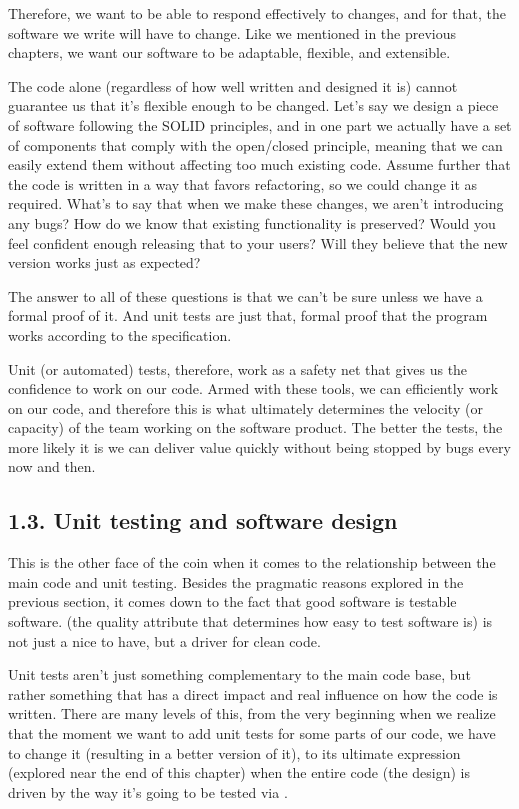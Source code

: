 \documentclass[a4paper,10pt,english]{sphinxmanual}
\begin{document}
Therefore, we want to be able to respond effectively to changes, and for that, the software
we write will have to change. Like we mentioned in the previous chapters, we want our
software to be adaptable, flexible, and extensible.

The code alone (regardless of how well written and designed it is) cannot guarantee us that
it’s flexible enough to be changed. Let’s say we design a piece of software following the
SOLID principles, and in one part we actually have a set of components that comply with
the open/closed principle, meaning that we can easily extend them without affecting too
much existing code. Assume further that the code is written in a way that favors
refactoring, so we could change it as required. What’s to say that when we make these
changes, we aren’t introducing any bugs? How do we know that existing functionality is
preserved? Would you feel confident enough releasing that to your users? Will they believe
that the new version works just as expected?

The answer to all of these questions is that we can’t be sure unless we have a formal proof
of it. And unit tests are just that, formal proof that the program works according to the
specification.

Unit (or automated) tests, therefore, work as a safety net that gives us the confidence to
work on our code. Armed with these tools, we can efficiently work on our code, and
therefore this is what ultimately determines the velocity (or capacity) of the team working
on the software product. The better the tests, the more likely it is we can deliver value
quickly without being stopped by bugs every now and then.


\subsection{1.3. Unit testing and software design}
\label{\detokenize{chapters/8_unit_testing/index:unit-testing-and-software-design}}
This is the other face of the coin when it comes to the relationship between the main code
and unit testing. Besides the pragmatic reasons explored in the previous section, it comes
down to the fact that good software is testable software.  (the quality attribute
that determines how easy to test software is) is not just a nice to have, but a driver for clean
code.

Unit tests aren’t just something complementary to the main code base, but rather something
that has a direct impact and real influence on how the code is written. There are many
levels of this, from the very beginning when we realize that the moment we want to add
unit tests for some parts of our code, we have to change it (resulting in a better version of
it), to its ultimate expression (explored near the end of this chapter) when the entire code
(the design) is driven by the way it’s going to be tested via .
\end{document}

